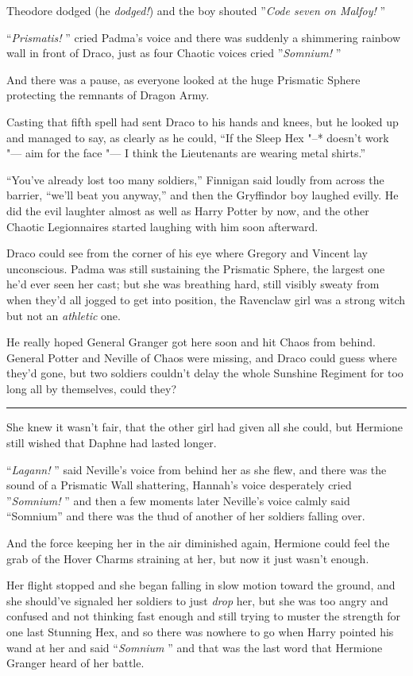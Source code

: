 Theodore dodged (he \emph{dodged!}) and the boy shouted ''\emph{Code
seven on Malfoy!} ''

``\emph{Prismatis!} '' cried Padma's voice and there was suddenly a
shimmering rainbow wall in front of Draco, just as four Chaotic voices
cried ''\emph{Somnium!} ''

And there was a pause, as everyone looked at the huge Prismatic Sphere
protecting the remnants of Dragon Army.

Casting that fifth spell had sent Draco to his hands and knees, but he
looked up and managed to say, as clearly as he could, ``If the Sleep Hex
"--* doesn't work "--- aim for the face "--- I think the Lieutenants are wearing
metal shirts.''

``You've already lost too many soldiers,'' Finnigan said loudly from
across the barrier, ``we'll beat you anyway,'' and then the Gryffindor
boy laughed evilly. He did the evil laughter almost as well as Harry
Potter by now, and the other Chaotic Legionnaires started laughing with
him soon afterward.

Draco could see from the corner of his eye where Gregory and Vincent lay
unconscious. Padma was still sustaining the Prismatic Sphere, the
largest one he'd ever seen her cast; but she was breathing hard, still
visibly sweaty from when they'd all jogged to get into position, the
Ravenclaw girl was a strong witch but not an \emph{athletic} one.

He really hoped General Granger got here soon and hit Chaos from behind.
General Potter and Neville of Chaos were missing, and Draco could guess
where they'd gone, but two soldiers couldn't delay the whole Sunshine
Regiment for too long all by themselves, could they?

\begin{center}\rule{3in}{0.4pt}\end{center}

She knew it wasn't fair, that the other girl had given all she could,
but Hermione still wished that Daphne had lasted longer.

``\emph{Lagann!} '' said Neville's voice from behind her as she flew, and
there was the sound of a Prismatic Wall shattering, Hannah's voice
desperately cried ''\emph{Somnium!} '' and then a few moments later
Neville's voice calmly said ``Somnium'' and there was the thud of
another of her soldiers falling over.

And the force keeping her in the air diminished again, Hermione could
feel the grab of the Hover Charms straining at her, but now it just
wasn't enough.

Her flight stopped and she began falling in slow motion toward the
ground, and she should've signaled her soldiers to just \emph{drop} her,
but she was too angry and confused and not thinking fast enough and
still trying to muster the strength for one last Stunning Hex, and so
there was nowhere to go when Harry pointed his wand at her and said
``\emph{Somnium} '' and that was the last word that Hermione Granger heard
of her battle.

